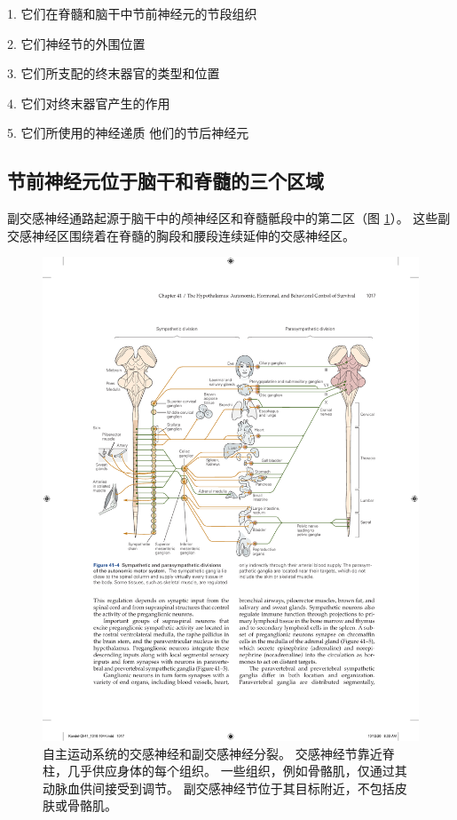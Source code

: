 1. 它们在脊髓和脑干中节前神经元的节段组织 

2. 它们神经节的外围位置 

3. 它们所支配的终末器官的类型和位置 

4. 它们对终末器官产生的作用 

5. 它们所使用的神经递质 他们的节后神经元

\subsection{节前神经元位于脑干和脊髓的三个区域}

副交感神经通路起源于脑干中的颅神经区和脊髓骶段中的第二区（图 \ref{fig:41_4}）。 
这些副交感神经区围绕着在脊髓的胸段和腰段连续延伸的交感神经区。

\begin{figure}[htbp]
	\centering
	\includegraphics[width=0.95\linewidth]{chap41/fig_41_4}
	\caption{自主运动系统的交感神经和副交感神经分裂。 交感神经节靠近脊柱，几乎供应身体的每个组织。 一些组织，例如骨骼肌，仅通过其动脉血供间接受到调节。 副交感神经节位于其目标附近，不包括皮肤或骨骼肌。}
	\label{fig:41_4}
\end{figure}

